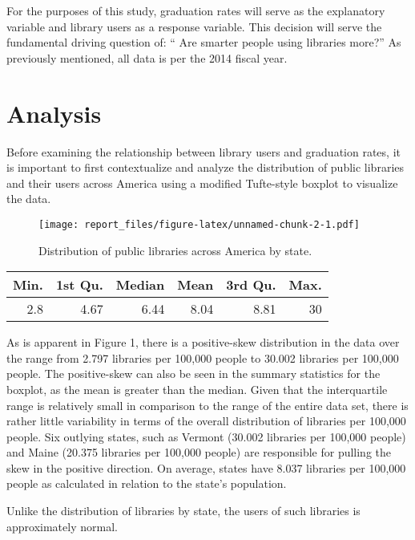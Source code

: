\documentclass[12pt,]{article}
\begin{document}
For the purposes of this study, graduation rates will serve as the
explanatory variable and library users as a response variable. This
decision will serve the fundamental driving question of: `` Are smarter
people using libraries more?'' As previously mentioned, all data is per
the 2014 fiscal year.

\section{Analysis}\label{analysis}

Before examining the relationship between library users and graduation
rates, it is important to first contextualize and analyze the
distribution of public libraries and their users across America using a
modified Tufte-style boxplot to visualize the data.

\vspace{20pt}

\begin{figure}[htbp]
\centering
\texttt{[image: report\_files/figure-latex/unnamed-chunk-2-1.pdf]}
\caption{Distribution of public libraries across America by state.}
\end{figure}

\begin{longtable}[]{@{}rrrrrr@{}}
\toprule
Min. & 1st Qu. & Median & Mean & 3rd Qu. & Max.\tabularnewline
\midrule
\endhead
2.8 & 4.67 & 6.44 & 8.04 & 8.81 & 30\tabularnewline
\bottomrule
\end{longtable}

\vspace{10pt}

As is apparent in Figure 1, there is a positive-skew distribution in the
data over the range from 2.797 libraries per 100,000 people to 30.002
libraries per 100,000 people. The positive-skew can also be seen in the
summary statistics for the boxplot, as the mean is greater than the
median. Given that the interquartile range is relatively small in
comparison to the range of the entire data set, there is rather little
variability in terms of the overall distribution of libraries per
100,000 people. Six outlying states, such as Vermont (30.002 libraries
per 100,000 people) and Maine (20.375 libraries per 100,000 people) are
responsible for pulling the skew in the positive direction. On average,
states have 8.037 libraries per 100,000 people as calculated in relation
to the state's population.

Unlike the distribution of libraries by state, the users of such
libraries is approximately normal.
\end{document}
